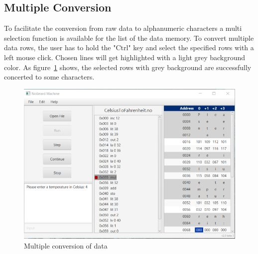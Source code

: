 \subsection{Multiple Conversion}
To facilitate the conversion from raw data to alphanumeric characters a multi selection function is available for the list of the data memory.
To convert multiple data rows, the user has to hold the "Ctrl" key and select the specified rows with a left mouse click. Chosen lines will get highlighted with a light grey background color. As figure~\ref{fig:multipleConversion} shows, the selected rows with grey background are successfully concerted to some characters.
\begin{figure}[h] 
	\centering
	\includegraphics[scale=.85]{images/screenshot-5.png}
	\caption{Multiple conversion of data}
	\label{fig:multipleConversion}
\end{figure}
